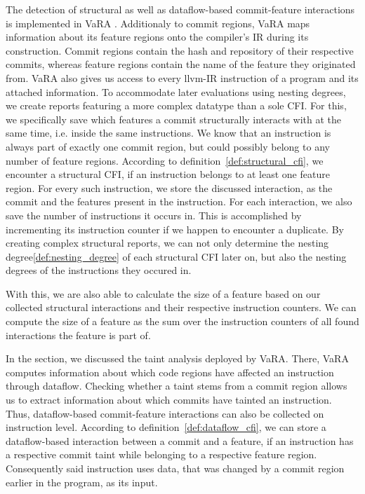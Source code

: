 The detection of structural as well as dataflow-based commit-feature interactions is implemented in VaRA \cite{VaRA2023}.
Additionaly to commit regions, VaRA maps information about its feature regions onto the compiler's IR during its construction.
Commit regions contain the hash and repository of their respective commits, whereas feature regions contain the name of the feature they originated from.
VaRA also gives us access to every llvm-IR instruction of a program and its attached information.
To accommodate later evaluations using nesting degrees, we create reports featuring a more complex datatype than a sole CFI.
For this, we specifically save which features a commit structurally interacts with at the same time, i.e. inside the same instructions.
We know that an instruction is always part of exactly one commit region, but could possibly belong to any number of feature regions.
According to definition~\ref{def:structural_cfi}, we encounter a structural CFI, if an instruction belongs to at least one feature region.
For every such instruction, we store the discussed interaction, as the commit and the features present in the instruction.
For each interaction, we also save the number of instructions it occurs in. 
This is accomplished by incrementing its instruction counter if we happen to encounter a duplicate. 
By creating complex structural reports, we can not only determine the nesting degree\ref{def:nesting_degree} of each structural CFI later on, but also the nesting degrees of the instructions they occured in.

With this, we are also able to calculate the size of a feature based on our collected structural interactions and their respective instruction counters.
We can compute the size of a feature as the sum over the instruction counters of all found interactions the feature is part of. 

In the  section, we discussed the taint analysis deployed by VaRA.
There, VaRA computes information about which code regions have affected an instruction through dataflow.
Checking whether a taint stems from a commit region allows us to extract information about which commits have tainted an instruction.
Thus, dataflow-based commit-feature interactions can also be collected on instruction level.
According to definition~\ref{def:dataflow_cfi}, we can store a dataflow-based interaction between a commit and a feature, if an instruction has a respective commit taint while belonging to a respective feature region.
Consequently said instruction uses data, that was changed by a commit region earlier in the program, as its input. 

